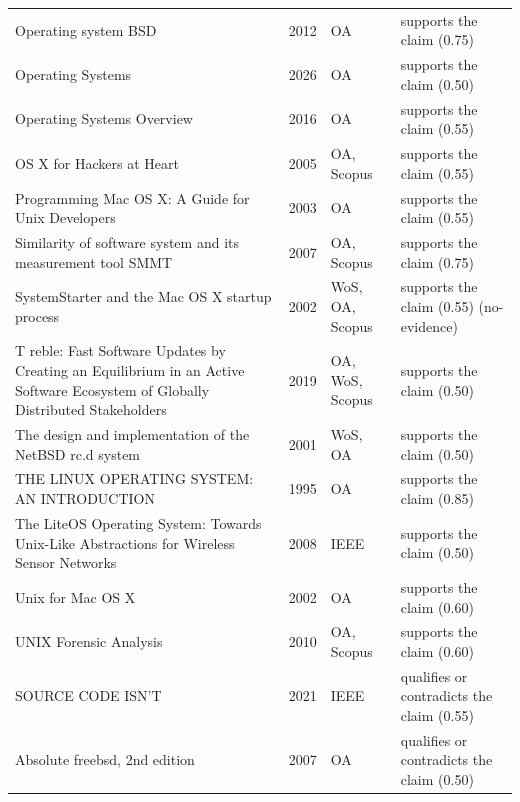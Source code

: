 \begin{longtable}{@{}%
  >{\raggedright\arraybackslash}p{}c%
  >{\raggedright\arraybackslash}p{}%
  >{\raggedright\arraybackslash}p{}@{}}
Operating system BSD & 2012 & OA & supports the claim (0.75) \\
Operating Systems & 2026 & OA & supports the claim (0.50) \\
Operating Systems Overview & 2016 & OA & supports the claim (0.55) \\
OS X for Hackers at Heart & 2005 & OA, Scopus & supports the claim (0.55) \\
Programming Mac OS X: A Guide for Unix Developers & 2003 & OA & supports the claim (0.55) \\
Similarity of software system and its measurement tool SMMT & 2007 & OA, Scopus & supports the claim (0.75) \\
SystemStarter and the Mac OS X startup process & 2002 & WoS, OA, Scopus & supports the claim (0.55) (no-evidence) \\
T reble: Fast Software Updates by Creating an Equilibrium in an Active Software Ecosystem of Globally Distributed Stakeholders & 2019 & OA, WoS, Scopus & supports the claim (0.50) \\
The design and implementation of the NetBSD rc.d system & 2001 & WoS, OA & supports the claim (0.50) \\
THE LINUX OPERATING SYSTEM: AN INTRODUCTION & 1995 & OA & supports the claim (0.85) \\
The LiteOS Operating System: Towards Unix-Like Abstractions for Wireless Sensor Networks & 2008 & IEEE & supports the claim (0.50) \\
Unix for Mac OS X & 2002 & OA & supports the claim (0.60) \\
UNIX Forensic Analysis & 2010 & OA, Scopus & supports the claim (0.60) \\
13 SOURCE CODE ISN'T & 2021 & IEEE & qualifies or contradicts the claim (0.55) \\
Absolute freebsd, 2nd edition & 2007 & OA & qualifies or contradicts the claim (0.50) \\
\end{longtable}
\endgroup
